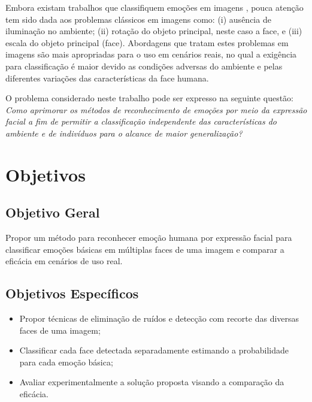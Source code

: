 Embora existam trabalhos que classifiquem emoções em imagens \citep{kim2016fusing, yu2016customized,barsoum2016training}, pouca atenção tem sido dada aos problemas clássicos em imagens como: (i) ausência de iluminação no ambiente; (ii) rotação do objeto principal, neste caso a face, e (iii) escala do objeto principal (face). Abordagens que tratam estes problemas em imagens são mais apropriadas para o uso em cenários reais, no qual a exigência  para classificação é maior devido as condições adversas do ambiente e pelas diferentes variações das características da face humana. 

O problema considerado neste trabalho pode ser expresso na seguinte questão: \textit{Como aprimorar os métodos de reconhecimento de emoções por meio da expressão facial a fim de permitir a classificação independente das características do ambiente e de indivíduos para o alcance de maior generalização?} 

\section{Objetivos}

\subsection{Objetivo Geral}
Propor um método para reconhecer emoção humana por expressão facial para classificar emoções básicas em múltiplas faces de uma imagem e comparar a eficácia em cenários de uso real.

\subsection{Objetivos Específicos}
\begin{itemize}
 \item Propor técnicas de eliminação de ruídos e detecção com recorte das diversas faces de uma imagem;
 \item Classificar cada face detectada separadamente estimando a probabilidade para cada emoção básica;
 \item Avaliar experimentalmente a solução proposta visando a comparação da eficácia.
\end{itemize}


